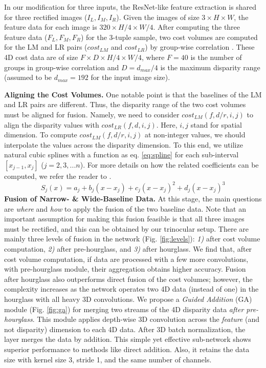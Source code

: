 \documentclass[10pt,twocolumn,letterpaper]{article}
\begin{document}
In our modification for three inputs, the ResNet-like feature extraction \cite{chang2018pyramid, guo2019group} is shared for three rectified images ($I_L,I_M,I_R$). Given the images of size $3\times H\times W$, the feature data for each image is $320\times H/4\times W/4$. After computing the three feature data ($F_L,F_M,F_R$) for the 3-tuple sample, two cost volumes are computed for the LM and LR pairs ($cost_{LM}$ and $cost_{LR}$) by group-wise correlation \cite{guo2019group}. These 4D cost data are of size $F\times D\times H/4\times W/4$, where $F=40$ is the number of groups in group-wise correlation and $D=d_{max}/4$ is the maximum disparity range (assumed to be $d_{max}=192$ for the input image size).

\noindent\textbf{Aligning the Cost Volumes.} One notable point is that the baselines of the LM and LR pairs are different. Thus, the disparity range of the two cost volumes must be aligned for fusion. Namely, we need to consider $cost_{LM}(f,d/r,i,j)$ to align the disparity values with $cost_{LR}(f,d,i,j)$. Here, $i,j$ stand for spatial dimension. To compute $cost_{LM}(f,d/r,i,j)$ at non-integer values, we should interpolate the values across the disparity dimension. To this end, we utilize natural cubic splines with a function as eq. \ref{eq:spline} for each sub-interval $[x_{j-1},x_{j}]$ ($j=2,3,...n$). For more details on how the related coefficients can be computed, we refer the reader to \cite{mckinley1998cubic}.
\begin{equation}
	{\displaystyle {S}_{j}\left(x\right)=a_{j}+b_{j}\left(x-x_{j}\right)+c_{j}{\left(x-x_{j}\right)}^{2}+d_{j}{\left(x-x_{j}\right)}^{3}}
	\label{eq:spline}
\end{equation}
\noindent\textbf{Fusion of Narrow- \& Wide-Baseline Data.} At this stage, the main questions are \emph{where} and \emph{how} to apply the fusion of the two baseline data. Note that an important assumption for making this fusion feasible is that all three images must be rectified, and this can be obtained by our trinocular setup. There are mainly three levels of fusion in the network (Fig. \ref{fig:levels}): \emph{1)} after cost volume computation, \emph{2)} after pre-hourglass, and \emph{3)} after hourglass. We find that, after cost volume computation, if data are processed with a few more convolutions, \ie with pre-hourglass module, their aggregation obtains higher accuracy. Fusion after hourglass also outperforms direct fusion of the cost volumes; however, the complexity increases as the network operates two 4D data (instead of one) in the hourglass with all heavy 3D convolutions. We propose a \emph{Guided Addition} (GA) module (Fig. \ref{fig:ga}) for merging two streams of the 4D disparity data \emph{after pre-hourglass}. This module applies depth-wise 3D convolution across the \emph{feature} (and not disparity) dimension to each 4D data. After 3D batch normalization, the layer merges the data by addition. This simple yet effective sub-network shows superior performance to methods like direct addition. Also, it retains the data size with kernel size 3, stride 1, and the same number of channels.
\end{document}
